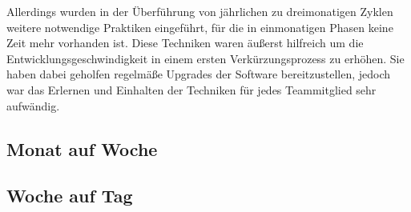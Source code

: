 Allerdings wurden in der Überführung von jährlichen zu dreimonatigen Zyklen
weitere notwendige Praktiken eingeführt, für die in einmonatigen Phasen keine
Zeit mehr vorhanden ist. Diese Techniken waren äußerst hilfreich um die
Entwicklungsgeschwindigkeit in einem ersten Verkürzungsprozess zu erhöhen. Sie
haben dabei geholfen regelmäße Upgrades der Software bereitzustellen, jedoch
war das Erlernen und Einhalten der Techniken für jedes Teammitglied sehr
aufwändig.


\subsection{Monat auf Woche}
\label{subsec:monat-auf-woche}

\subsection{Woche auf Tag}
\label{subsec:subscription-modell}
